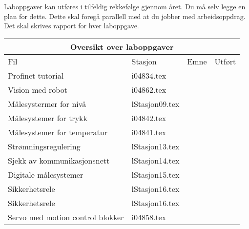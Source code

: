 Laboppgaver kan utføres i tilfeldig rekkefølge gjennom året. Du må selv legge en plan for dette. Dette skal foregå parallell med at du jobber med arbeidsoppdrag. Det skal skrives rapport for hver laboppgave.  
\begin{center}
	\begin{tabular}{| m{5cm} |m{2cm} |m{2cm} |m{1cm} |} 
\hline
	\multicolumn{4}{|c|}{\textbf{\cellcolor[HTML]{D5D5D5}Oversikt over laboppgaver}} \\
\hline
\hline
\rowcolor [HTML]{D5D5D5}
Fil	&Stasjon&Emne&Utført\\ \hline
		Profinet tutorial & i04834.tex & & \\ \cline{1-4}
		Vision med robot & i04862.tex & & \\ \cline{1-4}
		Målesystermer for nivå & lStasjon09.tex & & \\ \cline{1-4}
		Målesystemer for trykk & i04842.tex &  &\\ \cline{1-4}
		Målesystemer for temperatur & i04841.tex &  &\\ \cline{1-4}
		Strømningsregulering & lStasjon13.tex &  &\\ \cline{1-4}
		Sjekk av kommunikasjonsnett & lStasjon14.tex &  &\\ \cline{1-4}
		Digitale målesystemer & lStasjon15.tex &  &\\ \cline{1-4}
		Sikkerhetsrele & lStasjon16.tex &  &\\ \cline{1-4}
		Sikkerhetsrele & lStasjon16.tex &  &\\ \cline{1-4}
		Servo med motion control blokker & i04858.tex &  &\\ \cline{1-4}
		
\end{tabular}
\end{center}
